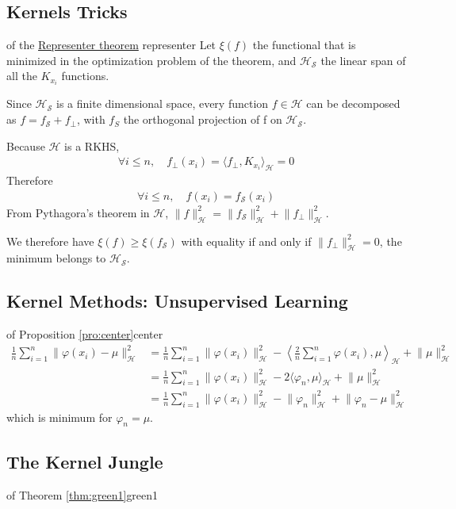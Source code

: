 \documentclass[10pt]{article}
\begin{document}
\subsection{Kernels Tricks}

\begin{Proof}{of the \hyperref[thm:representer]{Representer theorem}}
  {representer}
  Let $\xi(f)$ the functional that is minimized in the optimization problem of 
  the  theorem, and $\mathcal{H}_\mathcal{S}$ the linear span of all the 
  $K_{x_i}$ functions. 
  
  Since $\mathcal{H}_\mathcal{S}$ is a finite dimensional space, every function 
  $f\in\mathcal{H}$ can be decomposed as $f = f_\mathcal{S} + f_\perp$, with 
  $f_S$ the orthogonal projection of f on $\mathcal{H}_\mathcal{S}$.

  Because $\mathcal{H}$ is a RKHS, 
  \begin{align*}
    \forall i \leq n,\quad f_\perp(x_i) = \langle f_\perp, K_{x_i} 
    \rangle_\mathcal{H} = 0
  \end{align*}
  Therefore 
  \begin{align*}
    \forall  i \leq n,\quad f(x_i) = f_\mathcal{S}(x_i)
  \end{align*}
  From Pythagora's theorem in $\mathcal{H}$, $\lVert f\rVert^2_\mathcal{H} = 
  \lVert f_\mathcal{S}\rVert^2_\mathcal{H} + \lVert f_\perp
  \rVert^2_\mathcal{H}$.

  We therefore have $\xi(f) \geq \xi(f_\mathcal{S})$ with equality if and only
  if $\lVert f_\perp\rVert^2_\mathcal{H} = 0$, the minimum belongs to 
  $\mathcal{H}_\mathcal{S}$.
\end{Proof}

\subsection{Kernel Methods: Unsupervised Learning}

\begin{Proof}{of Proposition \ref{pro:center}}{center}
  \begin{align*}
    \frac{1}{n}\sum_{i=1}^n \lVert \varphi(x_i) - \mu \rVert^2_\mathcal{H} & =
    \frac{1}{n}\sum_{i=1}^n \lVert \varphi(x_i)\rVert^2_\mathcal{H} - \left
    \langle \frac{2}{n}\sum_{i=1}^n\varphi(x_i), \mu \right\rangle_\mathcal{H} 
    + \lVert\mu \rVert^2_\mathcal{H}\\
    & = \frac{1}{n}\sum_{i=1}^n \lVert \varphi(x_i)\rVert^2_\mathcal{H} - 2 
    \langle \varphi_n, \mu \rangle_\mathcal{H} + \lVert\mu \rVert^2_\mathcal{H}
    \\
    & = \frac{1}{n}\sum_{i=1}^n \lVert \varphi(x_i)\rVert^2_\mathcal{H} - \lVert
    \varphi_n \rVert^2_\mathcal{H} + \lVert \varphi_n - \mu \rVert^2_\mathcal{H}
  \end{align*}
  which is minimum for $\varphi_n = \mu$.
\end{Proof}

\subsection{The Kernel Jungle}

\begin{Proof}{of Theorem \ref{thm:green1}}{green1}
  
\end{Proof}
\end{document}
